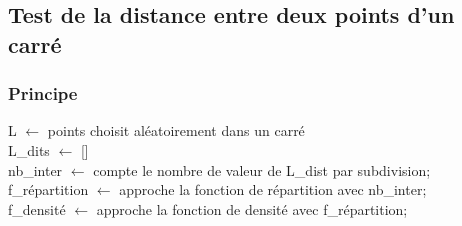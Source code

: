 \documentclass[aspectratio=43]{beamer}
\begin{document}
    \subsection{Test de la distance entre deux points d'un carré}
    \begin{frame}
        \frametitle{Principe}
        \begin{minipage}{0.5\textwidth}
            \SetAlFnt{\tiny}
            \SetAlCapFnt{\tiny}
            \SetAlCapNameFnt{\tiny}
            \begin{algorithm}[H]
                \tiny
                \caption{\tiny Test de la densité dans un carré} 


                \BlankLine

                L $\leftarrow$ \n points choisit aléatoirement dans un carré\\
                L\_dits $\leftarrow$ []\\
                nb\_inter $\leftarrow$ compte le nombre de valeur de L\_dist par subdivision;\\
                f\_répartition $\leftarrow$ approche la fonction de répartition avec nb\_inter;\\
                f\_densité $\leftarrow$ approche la fonction de densité avec f\_répartition;\\
                \end{algorithm}
        \end{minipage}
        \hfill
        \begin{minipage}{0.45\textwidth}
            \center
\end{minipage}
\end{frame}
\end{document}
